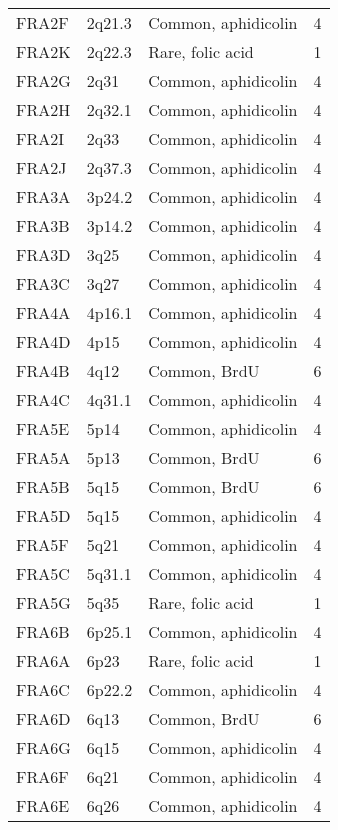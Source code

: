 \documentclass[phd,tocprelim]{cornell}
\begin{document}
\begin{center}
\begin{longtable}{|l|l|l|l|}
     FRA2F  & 2q21.3   & Common, aphidicolin   & 4 \\
     FRA2K  & 2q22.3   & Rare, folic acid    & 1 \\
     FRA2G  & 2q31     & Common, aphidicolin   & 4 \\
     FRA2H  & 2q32.1   & Common, aphidicolin   & 4 \\
     FRA2I  & 2q33     & Common, aphidicolin   & 4 \\
     FRA2J  & 2q37.3   & Common, aphidicolin   & 4 \\
     FRA3A  & 3p24.2   & Common, aphidicolin   & 4 \\
     FRA3B  & 3p14.2   & Common, aphidicolin   & 4 \\
     FRA3D  & 3q25     & Common, aphidicolin   & 4 \\
     FRA3C  & 3q27     & Common, aphidicolin   & 4 \\
     FRA4A  & 4p16.1   & Common, aphidicolin   & 4 \\
     FRA4D  & 4p15     & Common, aphidicolin   & 4 \\
     FRA4B  & 4q12     & Common, BrdU          & 6 \\
     FRA4C  & 4q31.1   & Common, aphidicolin   & 4 \\
     FRA5E  & 5p14     & Common, aphidicolin   & 4 \\
     FRA5A  & 5p13     & Common, BrdU          & 6 \\
     FRA5B  & 5q15     & Common, BrdU          & 6 \\
     FRA5D  & 5q15     & Common, aphidicolin   & 4 \\
     FRA5F  & 5q21     & Common, aphidicolin   & 4 \\
     FRA5C  & 5q31.1   & Common, aphidicolin   & 4 \\
     FRA5G  & 5q35     & Rare, folic acid    & 1 \\
     FRA6B  & 6p25.1   & Common, aphidicolin   & 4 \\
     FRA6A  & 6p23     & Rare, folic acid    & 1 \\
     FRA6C  & 6p22.2   & Common, aphidicolin   & 4 \\
     FRA6D  & 6q13     & Common, BrdU          & 6 \\
     FRA6G  & 6q15     & Common, aphidicolin   & 4 \\
     FRA6F  & 6q21     & Common, aphidicolin   & 4 \\
     FRA6E  & 6q26     & Common, aphidicolin   & 4 \\

\end{longtable}
\end{center}
\end{document}
